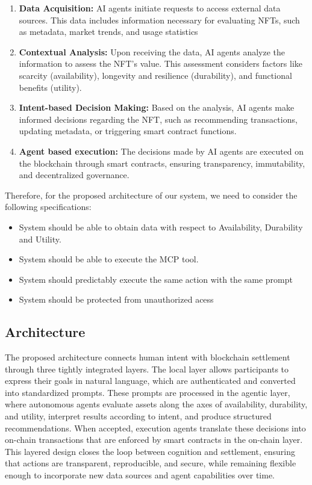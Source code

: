 \begin{enumerate}
    \item \textbf{Data Acquisition:} AI agents initiate requests to access external data sources. This data includes information necessary for evaluating NFTs, such as metadata, market trends, and usage statistics
    \item \textbf{Contextual Analysis:} Upon receiving the data, AI agents analyze the information to assess the NFT's value. This assessment considers factors like scarcity (availability), longevity and resilience (durability), and functional benefits (utility).
    \item \textbf{Intent-based Decision Making:} Based on the analysis, AI agents make informed decisions regarding the NFT, such as recommending transactions, updating metadata, or triggering smart contract functions.
    \item \textbf{Agent based execution:}  The decisions made by AI agents are executed on the blockchain through smart contracts, ensuring transparency, immutability, and decentralized governance.
\end{enumerate}


Therefore, for the proposed architecture of our system, we need to consider the following specifications:

\begin{itemize}
    \item System should be able to obtain data with respect to Availability, Durability and Utility.
    \item System should be able to execute the MCP tool.
    \item System should predictably execute the same action with the same prompt
    \item System should be protected from unauthorized acess
\end{itemize}


\subsection{Architecture}

The proposed architecture connects human intent with blockchain settlement through three tightly integrated layers. The local layer allows participants to express their goals in natural language, which are authenticated and converted into standardized prompts. These prompts are processed in the agentic layer, where autonomous agents evaluate assets along the axes of availability, durability, and utility, interpret results according to intent, and produce structured recommendations. When accepted, execution agents translate these decisions into on-chain transactions that are enforced by smart contracts in the on-chain layer. This layered design closes the loop between cognition and settlement, ensuring that actions are transparent, reproducible, and secure, while remaining flexible enough to incorporate new data sources and agent capabilities over time.


